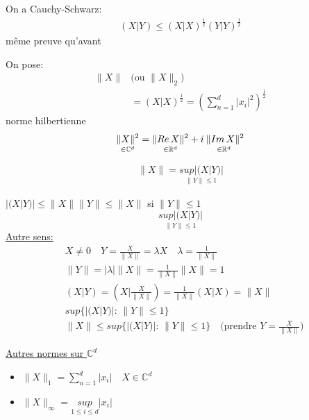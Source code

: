 \documentclass[a4paper]{report}
\newcommand\R{\ensuremath{\mathbb{R}}}
\newcommand\C{\ensuremath{\mathbb{C}}}
\theoremstyle{definition}
\begin{document}
\begin{explanation}
    On a Cauchy-Schwarz:
    \begin{align*}
        (X|Y) \le (X|X)^{\frac{1}{2}}(Y|Y)^{\frac{1}{2}}
    \end{align*}
    même preuve qu'avant
\end{explanation}
On pose:
\begin{align*}
    \|X\| & \text{(ou }\|X\|_2\text{)}\\
          &= (X|X)^{\frac{1}{2}} = \left( \sum_{n=1}^{d} |x_i|^2 \right)^{\frac{1}{2}}
\end{align*}
norme hilbertienne
\[
    \underset{\in \C^d}{\|X\|^2} = \underset{\in \R^d}{\|Re\,X\|^2} + i\underset{\in \R^d}{\:\|Im\,X\|^2}\\
\] 
\begin{lemma}
   \begin{align*}
       \|X\| = \underset{\|Y\|\le 1}{sup|(X|Y)|}
   \end{align*} 
\end{lemma}
\begin{explanation}
    $|(X|Y)| \le \|X\|\|Y\| \le \|X\|$ si $\|Y\| \le 1$
    \[
    \underset{\|Y\|\le 1}{sup|(X|Y)|}
    \] 
    \underline{Autre sens:} 
    \begin{align*}
        &X \neq 0 \quad Y =  \frac{X}{\|X\|} = \lambda X \quad \lambda = \frac{1}{\|X\|}\\
        &\|Y\| = |\lambda|\|X\| = \frac{1}{\|X\|}\|X\| = 1\\
        &(X|Y) = (X|\frac{X}{\|X\|}) = \frac{1}{\|X\|}(X|X) = \|X\|\\
        &sup \{|(X|Y)|: \, \|Y\| \le  1\}\\
        &\|X\| \le sup \{|(X|Y)|: \, \|Y\|\le 1\} \quad \text{(prendre }Y = \frac{X}{\|X\|}\text{)}
    \end{align*}

\end{explanation}
\underline{Autres normes sur $\C^d$}
\begin{itemize}
    \item $\|X\|_1 = \sum_{n=1}^{d} |x_i| \quad X \in \C^d$
    \item $\|X\|_{\infty} = \underset{1\le i \le d}{sup} |x_i|$
\end{itemize}
\end{document}
